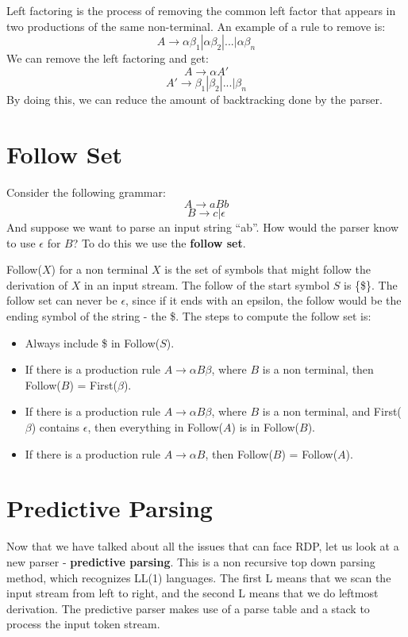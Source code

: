 \documentclass[12pt,letterpaper]{amsbook}
\theoremstyle{definition}
\begin{document}
Left factoring is the process of removing the common left factor that appears in two productions of the same non-terminal. An example of a rule to remove is:
\[A \rightarrow \alpha \beta_1|\alpha \beta_2 | ... | \alpha \beta_n\]
We can remove the left factoring and get:
\[A \rightarrow \alpha A'\]
\[A' \rightarrow \beta_1|\beta_2| ... | \beta_n\]
By doing this, we can reduce the amount of backtracking done by the parser.

\section{Follow Set}

Consider the following grammar:
\[A \rightarrow aBb\]
\[B \rightarrow c | \epsilon\]
And suppose we want to parse an input string ``ab''. How would the parser know to use $\epsilon$ for $B$? To do this we use the \textbf{follow set}.

Follow($X$) for a non terminal $X$ is the set of symbols that might follow the derivation of $X$ in an input stream. The follow of the start symbol $S$ is \{\$\}. The follow set can never be $\epsilon$, since if it ends with an epsilon, the follow would be the ending symbol of the string -  the \$. The steps to compute the follow set is:

\begin{itemize}
  \item Always include \$ in Follow($S$).
  \item If there is a production rule $A \rightarrow \alpha B \beta$, where $B$ is a non terminal, then Follow($B$)  = First($\beta$).
  \item If there is a production rule $A \rightarrow \alpha B \beta$, where $B$ is a non terminal, and First($\beta$) contains $\epsilon$, then everything in Follow($A$) is in Follow($B$).
  \item If there is a production rule $A \rightarrow \alpha B$, then Follow($B$) = Follow($A$).
\end{itemize}

\section{Predictive Parsing}

Now that we have talked about all the issues that can face RDP, let us look at a new parser - \textbf{predictive parsing}. This is a non recursive top down parsing method, which recognizes LL(1) languages. The first L means that we scan the input stream from left to right, and the second L means that we do leftmost derivation. The predictive parser makes use of a parse table and a stack to process the input token stream.
\end{document}
